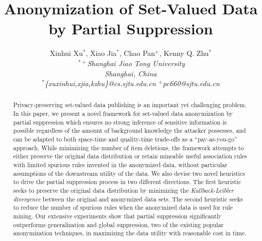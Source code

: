\documentclass[10pt,conference,letterpaper]{IEEEtran}
\begin{document}
\title{Anonymization of Set-Valued Data by Partial Suppression}
\author{
{Xinhui Xu{\small $^{*}$}, Xiao Jia{\small $^{*}$},
Chao Pan{\small $^{+}$}, Kenny Q. Zhu{\small $^{*}$}}%
\vspace{1.6mm}\\
\fontsize{10}{10}\selectfont\itshape
$~^{*+}$Shanghai Jiao Tong University\\
Shanghai, China\\
\fontsize{9}{9}\selectfont\ttfamily\upshape
$^*$\{xuxinhui,xjia,kzhu\}@cs.sjtu.edu.cn \hspace{5mm} $^+$pc660@sjtu.edu.cn
}


\maketitle

\begin{abstract}
Privacy-preserving set-valued data publishing is an important yet challenging
problem.
In this paper, we present a novel framework for set-valued
data anonymization by partial suppression which ensures no strong
inference of sensitive information is possible regardless of the amount of
background knowledge the attacker possesses, and can be adapted
to both space-time and quality-time trade-offs as a ``pay-as-you-go'' approach.
%
While minimizing the number of item deletions, the framework attempts to
either preserve the original data distribution or retain
mineable useful association rules with limited spurious rules invented in the
anonymized data, without particular assumptions of the downstream utility of the
data.
%
We also devise two novel heuristics to drive
the partial suppression process in two different directions.
The first heuristic seeks to preserve the original data distribution by
minimizing the {\em Kullback-Leibler divergence}
between the original and anonymized data sets.
The second heuristic seeks to reduce the number of spurious rules when
the anonymized data is used for rule mining.
Our extensive experiments show
that partial suppression significantly outperforms generalization and global
suppression, two of the existing popular anonymization techniques, in
maximizing the data utility with reasonable cost in time.
\end{abstract}
\end{document}
